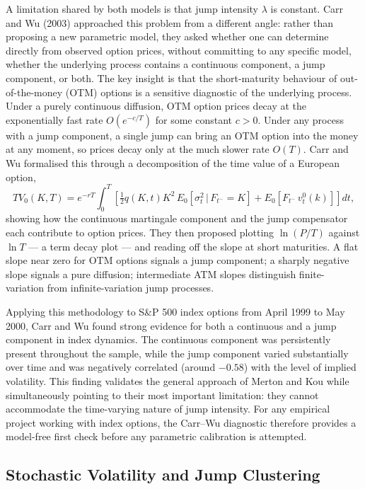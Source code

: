 \documentclass[12pt]{article}
\begin{document}
A limitation shared by both models is that jump intensity $\lambda$ is constant. Carr and Wu (2003) approached this problem from a different angle: rather than proposing a new parametric model, they asked whether one can determine directly from observed option prices, without committing to any specific model, whether the underlying process contains a continuous component, a jump component, or both. The key insight is that the short-maturity behaviour of out-of-the-money (OTM) options is a sensitive diagnostic of the underlying process. Under a purely continuous diffusion, OTM option prices decay at the exponentially fast rate $O(e^{-c/T})$ for some constant $c > 0$. Under any process with a jump component, a single jump can bring an OTM option into the money at any moment, so prices decay only at the much slower rate $O(T)$. Carr and Wu formalised this through a decomposition of the time value of a European option,
\begin{equation}
TV_0(K,T) = e^{-rT}\int_0^T\!\left[\tfrac{1}{2}q(K,t)K^2\,E_0\!\left[\sigma_t^2\,\big|\,F_{t^-}=K\right] + E_0\!\left[F_{t^-}\,v^0_t(k)\right]\right]dt,
\end{equation}
showing how the continuous martingale component and the jump compensator each contribute to option prices. They then proposed plotting $\ln(P/T)$ against $\ln T$ --- a term decay plot --- and reading off the slope at short maturities. A flat slope near zero for OTM options signals a jump component; a sharply negative slope signals a pure diffusion; intermediate ATM slopes distinguish finite-variation from infinite-variation jump processes.

Applying this methodology to S\&P 500 index options from April 1999 to May 2000, Carr and Wu found strong evidence for both a continuous and a jump component in index dynamics. The continuous component was persistently present throughout the sample, while the jump component varied substantially over time and was negatively correlated (around $-0.58$) with the level of implied volatility. This finding validates the general approach of Merton and Kou while simultaneously pointing to their most important limitation: they cannot accommodate the time-varying nature of jump intensity. For any empirical project working with index options, the Carr--Wu diagnostic therefore provides a model-free first check before any parametric calibration is attempted.

\subsection*{Stochastic Volatility and Jump Clustering}
\end{document}
